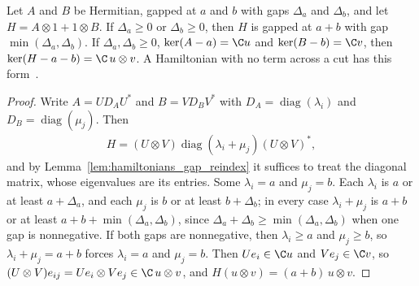 \begin{theorem}
    \label{thm:hamiltonians_gap_kronecker_sum}
    \leanok
    Let $A$ and $B$ be Hermitian, gapped at $a$ and $b$ with gaps $\Delta_a$ and
    $\Delta_b$, and let $H=A\otimes1+1\otimes B$. If $\Delta_a\ge0$ or
    $\Delta_b\ge0$, then $H$ is gapped at $a+b$ with gap $\min(\Delta_a,\Delta_b)$.
    If $\Delta_a,\Delta_b\ge0$, $\ker(A-a)=\C u$ and $\ker(B-b)=\C v$, then
    $\ker(H-a-b)=\C\,u\otimes v$. A Hamiltonian with no term across a cut has this
    form~\cite{OpenAI2026AreaLaw}.
\end{theorem}
\begin{proof}\leanok
    Write $A=UD_AU^{*}$ and $B=VD_BV^{*}$ with $D_A=\operatorname{diag}(\lambda_i)$ and
    $D_B=\operatorname{diag}(\mu_j)$. Then
    \begin{align*}
        H=(U\otimes V)\operatorname{diag}(\lambda_i+\mu_j)(U\otimes V)^{*},
    \end{align*}
    and by Lemma~\ref{lem:hamiltonians_gap_reindex} it suffices to treat the diagonal
    matrix, whose eigenvalues are its entries. Some $\lambda_i=a$ and $\mu_j=b$. Each
    $\lambda_i$ is $a$ or at least $a+\Delta_a$, and each $\mu_j$ is $b$ or at least
    $b+\Delta_b$; in every case $\lambda_i+\mu_j$ is $a+b$ or at least
    $a+b+\min(\Delta_a,\Delta_b)$, since $\Delta_a+\Delta_b\ge\min(\Delta_a,\Delta_b)$
    when one gap is nonnegative. If both gaps are nonnegative, then $\lambda_i\ge a$ and
    $\mu_j\ge b$, so $\lambda_i+\mu_j=a+b$ forces $\lambda_i=a$ and $\mu_j=b$. Then
    $Ue_i\in\C u$ and $Ve_j\in\C v$, so $(U\otimes V)e_{ij}=Ue_i\otimes Ve_j\in\C\,u\otimes v$,
    and $H(u\otimes v)=(a+b)\,u\otimes v$.
\end{proof}

